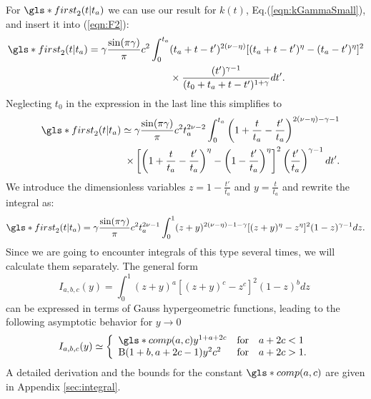 For $\gls*{first}_{2}(t|t_a)$ we can use our result for $k(t)$, Eq.(\ref{eqn:kGammaSmall}), and insert it into (\ref{eqn:F2}): 
\begin{align}
\gls*{first}_{2}(t|t_a) = \gamma\frac{\sin(\pi \gamma)}{\pi}  c^2 \int^{t_a}_0 & (t_a+t-t')^{2(\nu-\eta)}[(t_a+t-t')^\eta-(t_a-t')^\eta]^2  \nonumber \\
& \times \frac{(t')^{\gamma-1}}{(t_0+t_a+t-t')^{1+\gamma}} dt'.
\end{align}
%
Neglecting $t_0$ in the expression in the last line this simplifies to
%
\begin{align}
&& \gls*{first}_{2}(t|t_a) \simeq  \gamma \frac{\sin(\pi \gamma)}{\pi}  c^2 t_a^{2\nu-2} \int^{t_a}_0 \left(1+\frac{t}{t_a}-\frac{t'}{t_a} \right)^{2(\nu-\eta)-\gamma-1} \nonumber \\
&& \;\; \times \left[ \left(1+\frac{t}{t_a}-\frac{t'}{t_a} \right)^\eta-\left(1- \frac{t'}{t_a}\right)^\eta \right]^2 \left( \frac{t'}{t_a}\right)^{\gamma-1} dt' .
\end{align}
%
We introduce the dimensionless variables $z = 1-\frac{t'}{t_a}$ and $y = \frac{t}{t_a}$ and rewrite the integral as:
%
\begin{align}
 \gls*{first}_{2}(t|t_a) = \gamma \frac{\sin(\pi \gamma)}{\pi}  c^2 t_a^{2\nu-1}  \int^{1}_0 (z+y)^{2(\nu-\eta)-1-\gamma}[(z+y)^\eta-z^\eta]^2 (1-z)^{\gamma-1} dz . 
\end{align}
Since we are going to encounter integrals of this type several times, we will calculate them separately. The general form
\begin{equation}
I_{a,b,c}(y) = \int^{1}_0 (z+y)^{a}[(z+y)^c-z^c]^2 (1-z)^{b} dz \;  \label{eqn:Iabc} 
\end{equation}
can be expressed in terms of Gauss hypergeometric functions, leading to the following asymptotic behavior for $y \to 0$
\begin{equation}
I_{a,b,c}(y) \simeq \left\{ \begin{array}{l l l}
\gls*{comp}(a,c) y^{1+a+2c}    & \mathrm{for} &  a+2c < 1 \\
 \mathrm{B}(1+b,a+2c-1)y^2 c^2  & \mathrm{for} & a+2c > 1.
\end{array} \right. \label{eqn:IabcAsymptotic}
\end{equation}
A detailed derivation and the bounds for the constant $\gls*{comp}(a,c)$ are given in Appendix \ref{sec:integral}.

